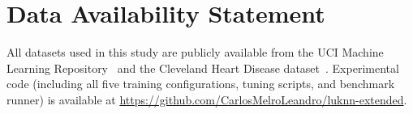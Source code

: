 \documentclass[lettersize,journal]{IEEEtran}
\begin{document}
\section*{Data Availability Statement}

All datasets used in this study are publicly available from the UCI Machine
Learning Repository~\cite{uci2017} and the Cleveland Heart Disease
dataset~\cite{detrano1989}.
Experimental code (including all five training configurations, tuning scripts,
and benchmark runner) is available at
\url{https://github.com/CarlosMelroLeandro/luknn-extended}.



\end{document}
